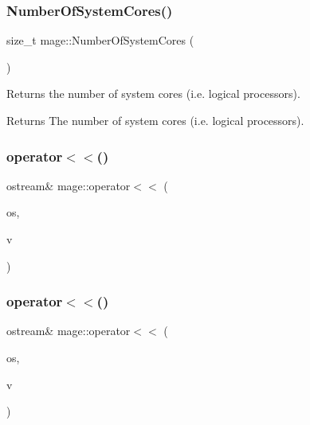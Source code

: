 \subsubsection{\texorpdfstring{Number\+Of\+System\+Cores()}{NumberOfSystemCores()}}
{\footnotesize\ttfamily size\+\_\+t mage\+::\+Number\+Of\+System\+Cores (\begin{DoxyParamCaption}{ }\end{DoxyParamCaption})}

Returns the number of system cores (i.\+e. logical processors).

\begin{DoxyReturn}{Returns}
The number of system cores (i.\+e. logical processors). 
\end{DoxyReturn}
\hypertarget{namespacemage_ac348ad49bf7e9912aa70cda1b0ca553d}{}\label{namespacemage_ac348ad49bf7e9912aa70cda1b0ca553d} 
\subsubsection{\texorpdfstring{operator$<$$<$()}{operator<<()}\hspace{0.1cm}{\footnotesize\ttfamily [1/3]}}
{\footnotesize\ttfamily ostream\& mage\+::operator$<$$<$ (\begin{DoxyParamCaption}\item[{ostream \&}]{os,  }\item[{const X\+M\+F\+L\+O\+A\+T2 \&}]{v }\end{DoxyParamCaption})}

\hypertarget{namespacemage_a44b2d3046802608544402245919f219b}{}\label{namespacemage_a44b2d3046802608544402245919f219b} 
\subsubsection{\texorpdfstring{operator$<$$<$()}{operator<<()}\hspace{0.1cm}{\footnotesize\ttfamily [2/3]}}
{\footnotesize\ttfamily ostream\& mage\+::operator$<$$<$ (\begin{DoxyParamCaption}\item[{ostream \&}]{os,  }\item[{const X\+M\+F\+L\+O\+A\+T3 \&}]{v }\end{DoxyParamCaption})}

\hypertarget{namespacemage_af6c1d1c5718d611450932bde30d2bfef}{}\label{namespacemage_af6c1d1c5718d611450932bde30d2bfef} 
